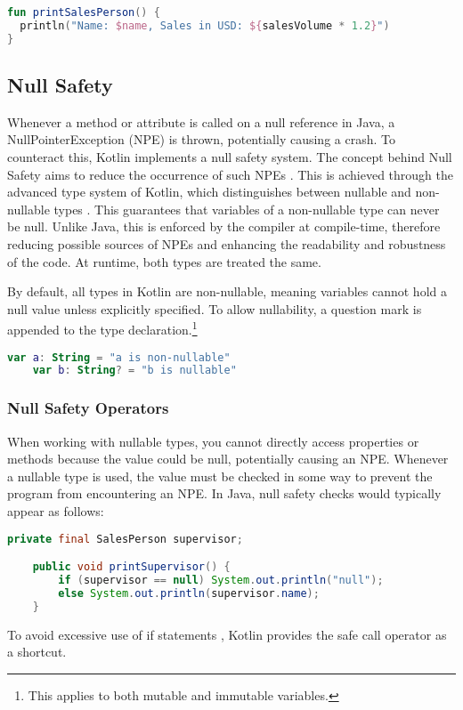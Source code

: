 \documentclass[a4paper, 11pt]{article}
\begin{document}
\begin{lstlisting}[language=Kotlin,title={String Interpolation}]
fun printSalesPerson() {
  println("Name: $name, Sales in USD: ${salesVolume * 1.2}")
}
\end{lstlisting}

\subsection{Null Safety}
  Whenever a method or attribute is called on a null reference in Java, a NullPointerException (NPE) is thrown, potentially causing a crash. To counteract this, Kotlin implements a null safety system. The concept behind Null Safety aims to reduce the occurrence of such NPEs \cite{nullsafety}. This is achieved through the advanced type system of Kotlin, which distinguishes between nullable and non-nullable types \cite{nullsafety-nullable-types}. This guarantees that variables of a non-nullable type can never be null. Unlike Java, this is enforced by the compiler at compile-time, therefore reducing possible sources of NPEs and enhancing the readability and robustness of the code. At runtime, both types are treated the same.
  
  By default, all types in Kotlin are non-nullable, meaning variables cannot hold a null value unless explicitly specified. To allow nullability, a question mark is appended to the type declaration.\footnote{This applies to both mutable and immutable variables.}

  \begin{lstlisting}[language=Kotlin]
    var a: String = "a is non-nullable"
    var b: String? = "b is nullable"
  \end{lstlisting}
  
\subsubsection{Null Safety Operators}
  When working with nullable types, you cannot directly access properties or methods because the value could be null, potentially causing an NPE. Whenever a nullable type is used, the value must be checked in some way to prevent the program from encountering an NPE.
  In Java, null safety checks would typically appear as follows:
  \begin{lstlisting}[language=Java]
    private final SalesPerson supervisor;

    public void printSupervisor() {
        if (supervisor == null) System.out.println("null");
        else System.out.println(supervisor.name);
    }
  \end{lstlisting}
  To avoid excessive use of if statements \cite{nullsafety-if-condition}, Kotlin provides the safe call operator as a shortcut.
\end{document}
